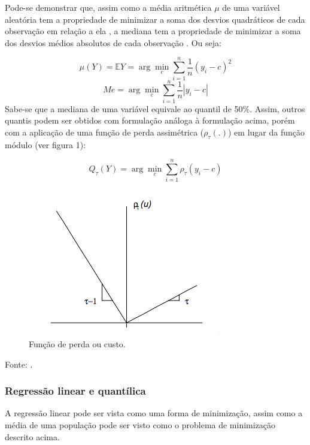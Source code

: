 \documentclass[a4paper, 12pt]{article}
\newcommand{\bcenter}{\begin{center}}
\newcommand{\ecenter}{\end{center}}
\begin{document}
Pode-se demonstrar que, assim como a média aritmética \(\mu\) de uma
variável aleatória tem a propriedade de minimizar a soma dos desvios
quadráticos de cada observação em relação a ela
\autocite[50]{matloff2017}, a mediana tem a propriedade de minimizar a
soma dos desvios médios absolutos de cada observação
\autocite[260]{matloff2017}. Ou seja:

\[\mu(Y) = \mathbb{E}Y = \arg \min_c \sum_{i = 1}^n \frac{1}{n}(y_i - c)^2\]
\[Me = \arg \min_c \sum_{i = 1}^n \frac{1}{n}|y_i - c|\] Sabe-se que a
mediana de uma variável equivale ao quantil de 50\%. Assim, outros
quantis podem ser obtidos com formulação análoga à formulação acima,
porém com a aplicação de uma função de perda assimétrica
(\(\rho_\tau(.)\)) em lugar da função módulo (ver figura 1):

\[Q_\tau(Y) = \arg \min_c \sum_{i = 1}^n \rho_\tau(y_i - c)\]

\begin{figure}[H]

{\centering \includegraphics[width=0.7\linewidth]{DmKq7} 

}

\caption{Função de perda ou custo.}\label{fig:unnamed-chunk-1}
\end{figure}

\bcenter Fonte: \textcite{qr}. \ecenter

\hypertarget{regressao-linear-e-quantilica}{%
\subsubsection{Regressão linear e
quantílica}\label{regressao-linear-e-quantilica}}

A regressão linear pode ser vista como uma forma de minimização, assim
como a média de uma população pode ser visto como o problema de
minimização descrito acima.
\end{document}
